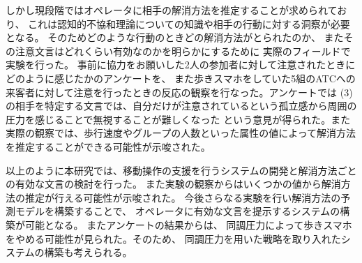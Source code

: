 \documentclass{kuisthesis}
\begin{document}
\begin{jabstract}
しかし現段階ではオペレータに相手の解消方法を推定することが求められており、
これは認知的不協和理論についての知識や相手の行動に対する洞察が必要となる。
そのためどのような行動のときどの解消方法がとられたのか、
またその注意文言はどれくらい有効なのかを明らかにするために
実際のフィールドで実験を行った。
事前に協力をお願いした2人の参加者に対して注意されたときにどのように感じたかのアンケートを、
また歩きスマホをしていた5組のATCへの来客者に対して注意を行ったときの反応の観察を行なった。アンケートでは
(3)の相手を特定する文言では、自分だけが注意されているという孤立感から周囲の圧力を感じることで無視することが難しくなった
という意見が得られた。また実際の観察では、歩行速度やグループの人数といった属性の値によって解消方法を推定することができる可能性が示唆された。

以上のように本研究では、移動操作の支援を行うシステムの開発と解消方法ごとの有効な文言の検討を行った。
また実験の観察からはいくつかの値から解消方法の推定が行える可能性が示唆された。
今後さらなる実験を行い解消方法の予測モデルを構築することで、
オペレータに有効な文言を提示するシステムの構築が可能となる。
またアンケートの結果からは、
同調圧力によって歩きスマホをやめる可能性が見られた。そのため、
同調圧力を用いた戦略を取り入れたシステムの構築も考えられる。
\end{jabstract}
\end{document}
